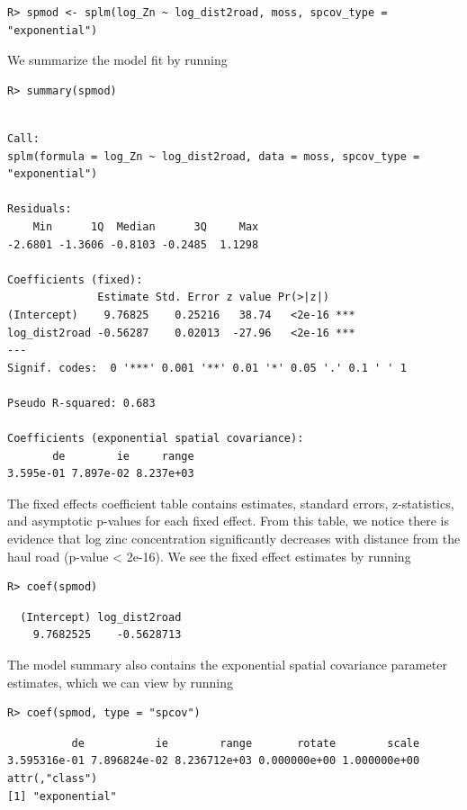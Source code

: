 \documentclass{article}
\begin{document}
\begin{verbatim}
R> spmod <- splm(log_Zn ~ log_dist2road, moss, spcov_type = "exponential")
\end{verbatim}

We summarize the model fit by running

\begin{verbatim}
R> summary(spmod)
\end{verbatim}

\begin{verbatim}

Call:
splm(formula = log_Zn ~ log_dist2road, data = moss, spcov_type = "exponential")

Residuals:
    Min      1Q  Median      3Q     Max 
-2.6801 -1.3606 -0.8103 -0.2485  1.1298 

Coefficients (fixed):
              Estimate Std. Error z value Pr(>|z|)    
(Intercept)    9.76825    0.25216   38.74   <2e-16 ***
log_dist2road -0.56287    0.02013  -27.96   <2e-16 ***
---
Signif. codes:  0 '***' 0.001 '**' 0.01 '*' 0.05 '.' 0.1 ' ' 1

Pseudo R-squared: 0.683

Coefficients (exponential spatial covariance):
       de        ie     range 
3.595e-01 7.897e-02 8.237e+03 
\end{verbatim}

The fixed effects coefficient table contains estimates, standard errors,
z-statistics, and asymptotic p-values for each fixed effect. From this
table, we notice there is evidence that log zinc concentration
significantly decreases with distance from the haul road (p-value
\textless{} 2e-16). We see the fixed effect estimates by running

\begin{verbatim}
R> coef(spmod)
\end{verbatim}

\begin{verbatim}
  (Intercept) log_dist2road 
    9.7682525    -0.5628713 
\end{verbatim}

The model summary also contains the exponential spatial covariance
parameter estimates, which we can view by running

\begin{verbatim}
R> coef(spmod, type = "spcov")
\end{verbatim}

\begin{verbatim}
          de           ie        range       rotate        scale 
3.595316e-01 7.896824e-02 8.236712e+03 0.000000e+00 1.000000e+00 
attr(,"class")
[1] "exponential"
\end{verbatim}
\end{document}
